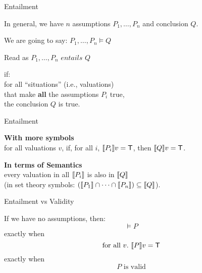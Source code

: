 \documentclass[xetex,aspectratio=169,14pt,hyperref={pdfpagelabels=true,pdflang={en-GB}}]{beamer}
\begin{document}


\begin{frame}[t]
  {Entailment}

  In general, we have $n$ assumptions $P_1, \ldots, P_n$ and
  conclusion $Q$.

  \bigskip
  \bigskip

  We are going to say: \qquad $P_1,\ldots,P_n \models Q$

  \hspace{3.5cm} \textcolor{black!60}{Read as $P_1,\ldots,P_n \textit{ entails } Q$}

  \bigskip

  if:\\
  \quad for all ``situations'' \textcolor{black!60}{(i.e., valuations)}\\
  \quad \quad that make \textbf{all} the assumptions $P_i$ true,\\
  \quad \qquad the conclusion $Q$ is true.

\end{frame}

\begin{frame}
  {Entailment}

  \textbf{With more symbols} \\\qquad for all valuations $v$, if, for
  all $i$, $\llbracket P_i \rrbracket v = \mathsf{T}$, then $\llbracket Q \rrbracket v = \mathsf{T}$.

  \bigskip

  \textbf{In terms of Semantics}\\ \qquad every valuation in all $\llbracket P_i \rrbracket$
  is also in $\llbracket Q \rrbracket$ \\ \qquad (in set theory symbols:
  $(\llbracket P_1 \rrbracket \cap \dots \cap \llbracket P_n \rrbracket) \subseteq \llbracket Q \rrbracket$).
\end{frame}

\begin{frame}
  {Entailment vs Validity}

  If we have no assumptions, then:
  \begin{displaymath}
    \models P
  \end{displaymath}
  exactly when
  \begin{displaymath}
    \textrm{for all }v.~\llbracket P \rrbracket v = \mathsf{T}
  \end{displaymath}
  exactly when
  \begin{displaymath}
    P\textrm{ is valid}
  \end{displaymath}
\end{frame}
\end{document}
